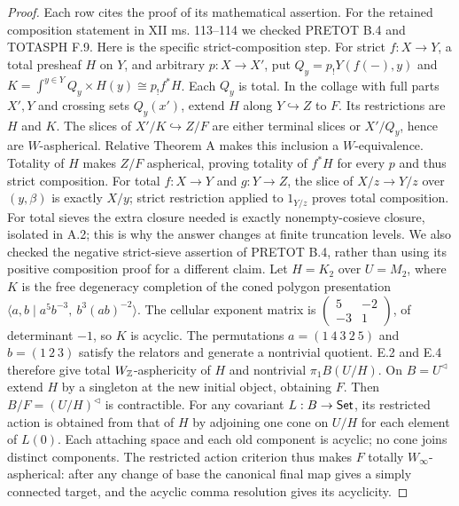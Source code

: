 \begin{proof}
Each row cites the proof of its mathematical assertion. For the
retained composition statement in XII ms. 113--114 we checked
PRETOT B.4 and TOTASPH F.9. Here is the specific strict-composition
step. For strict $f:X\to Y$, a total presheaf $H$ on $Y$, and
arbitrary $p:X\to X'$, put $Q_y=p_!Y(f(-),y)$ and
$K=\int^{y\in Y}Q_y\times H(y)\cong p_!f^*H$. Each $Q_y$
is total. In the collage with full parts $X',Y$ and crossing
sets $Q_y(x')$, extend $H$ along $Y\hookrightarrow Z$ to $F$.
Its restrictions are $H$ and $K$. The slices of
$X'/K\hookrightarrow Z/F$ are either terminal slices or
$X'/Q_y$, hence are $W$-aspherical. Relative Theorem A makes
this inclusion a $W$-equivalence. Totality of $H$ makes $Z/F$
aspherical, proving totality of $f^*H$ for every $p$ and thus
strict composition. For total $f:X\to Y$ and $g:Y\to Z$, the
slice of $X/z\to Y/z$ over $(y,\beta)$ is exactly $X/y$;
strict restriction applied to $1_{Y/z}$ proves total composition.
For total sieves the extra closure
needed is exactly nonempty-cosieve closure, isolated in A.2;
this is why the answer changes at finite truncation levels.
We also checked the negative strict-sieve assertion of PRETOT
B.4, rather than using its positive composition proof for a different
claim. Let $H=K_2$ over $U=M_2$, where $K$ is the free degeneracy
completion of the coned polygon presentation
$\langle a,b\mid a^5b^{-3},\ b^3(ab)^{-2}\rangle$.
The cellular exponent matrix is
$\left(\begin{smallmatrix}5&-2\\-3&1\end{smallmatrix}\right)$,
of determinant $-1$, so $K$ is acyclic. The permutations
$a=(1\ 4\ 3\ 2\ 5)$ and $b=(1\ 2\ 3)$ satisfy the relators
and generate a nontrivial quotient. E.2 and E.4 therefore give
total $W_{\mathbb Z}$-asphericity of $H$ and nontrivial
$\pi_1 B(U/H)$. On $B=U^{\triangleleft}$ extend $H$ by a
singleton at the new initial object, obtaining $F$.
Then $B/F=(U/H)^{\triangleleft}$ is contractible. For any
covariant $L:B\to\mathsf{Set}$, its restricted action is obtained
from that of $H$ by adjoining one cone on $U/H$ for each
element of $L(0)$. Each attaching space and each old component
is acyclic; no cone joins distinct components. The restricted
action criterion thus makes $F$ totally $W_\infty$-aspherical:
after any change of base the canonical final map gives a
simply connected target, and the acyclic comma resolution
gives its acyclicity.


\end{proof}

